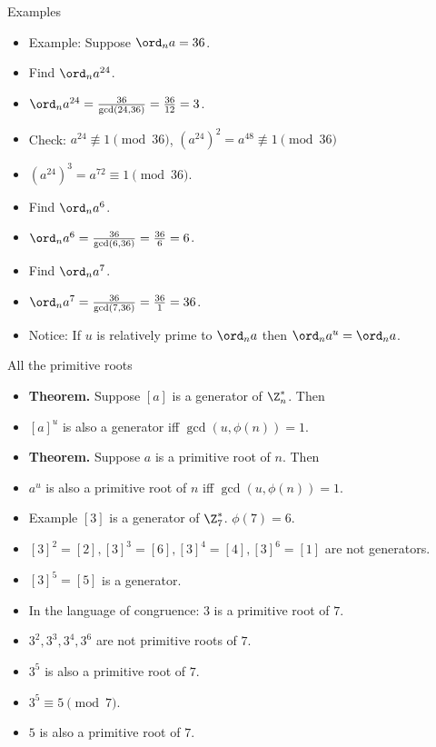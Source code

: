 \documentclass[handout]{beamer}
\begin{document}
\begin{frame}{Examples}

\begin{itemize}
  \item Example: Suppose $\ord_n a = 36$.
  \item Find $\ord_n a^{24}$.
  \item $\ord_n a^{24} = \frac{36}{\gcd(24,36)} = \frac{36}{12} = 3$.
  \item Check: $a^{24} \not\equiv 1 \pmod{36}$, $(a^{24})^2=a^{48} \not\equiv 1 \pmod{36}$
  \item $(a^{24})^3=a^{72} \equiv 1 \pmod{36}$.
  \item Find $\ord_n a^{6}$.
  \item $\ord_n a^{6} = \frac{36}{\gcd(6,36)} = \frac{36}{6} = 6$.
  \item Find $\ord_n a^{7}$.
  \item $\ord_n a^{7} = \frac{36}{\gcd(7,36)} = \frac{36}{1} = 36$.
  \item Notice: If $u$ is relatively prime to $\ord_n a$ then $\ord_n a^u = \ord_n a$.
\end{itemize}

\end{frame}

\begin{frame}{All the primitive roots}

\begin{itemize}
  \item \textbf{Theorem.} Suppose $[a]$ is a generator of $\Z_n^*$. Then
  \item $[a]^u$ is also a generator iff $\gcd(u,\phi(n)) = 1$.
  \item \textbf{Theorem.} Suppose $a$ is a primitive root of $n$. Then
  \item $a^u$ is also a primitive root of $n$ iff $\gcd(u,\phi(n))=1$.
  \item Example $[3]$ is a generator of $\Z_7^*$. $\phi(7) = 6$.
  \item $[3]^2 = [2], [3]^3 = [6], [3]^4=[4], [3]^6=[1]$ are not generators.
  \item $[3]^5=[5]$ is a generator.
  \item In the language of congruence: $3$ is a primitive root of $7$.
  \item $3^2, 3^3, 3^4, 3^6$ are not primitive roots of $7$.
  \item $3^5$ is also a primitive root of $7$.
  \item $3^5 \equiv 5 \pmod 7$.
  \item $5$ is also a primitive root of $7$.
\end{itemize}

\end{frame}
\end{document}
